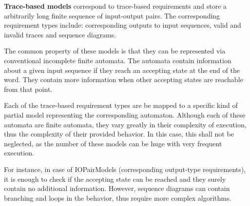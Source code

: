 
\textbf{Trace-based models} correspond to trace-based requirements and store a arbitrarily long finite sequence of input-output pairs. The corresponding requirement types include: corresponding outputs to input sequences, valid and invalid traces and sequence diagrams. 

The common property of these models is that they can be represented via conventional incomplete finite automata. The automata contain information about a given input sequence if they reach an accepting state at the end of the word. They contain more information when other accepting states are reachable from that point.

Each of the trace-based requirement types are be mapped to a specific kind of partial model representing the corresponding automaton. Although each of these automata are finite automata, they vary greatly in their complexity of execution, thus the complexity of their provided behavior. In this case, this shall not be neglected, as the number of these models can be huge with very frequent execution.

For instance, in case of IOPairModels (corresponding output-type requirements), it is enough to check if the accepting state can be reached and they surely contain no additional information. However, sequence diagrams can contain branching and loops in the behavior, thus require more complex algorithms.



